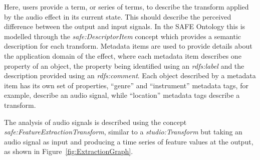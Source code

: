 		Here, users provide a term, or series of terms, to describe the transform applied by the audio effect in
		its current state. This should describe the perceived difference between the output and input signals. In
		the SAFE Ontology this is modelled through the \emph{safe:DescriptorItem} concept which provides a semantic
		description for each transform. Metadata items are used to provide details about the application domain of
		the effect, where each metadata item describes one property of an object, the property being identified
		using an \emph{rdfs:label} and the description provided using an \emph{rdfs:comment}. Each object described
		by a metadata item has its own set of properties, ``genre'' and ``instrument'' metadata tags, for example,
		describe an audio signal, while ``location'' metadata tags describe a transform.

		The analysis of audio signals is described using the concept \emph{safe:FeatureExtractionTransform},
		similar to a \emph{studio:Transform} but taking an audio signal as input and producing a time series of
		feature values at the output, as shown in Figure~\ref{fig:ExtractionGraph}.

